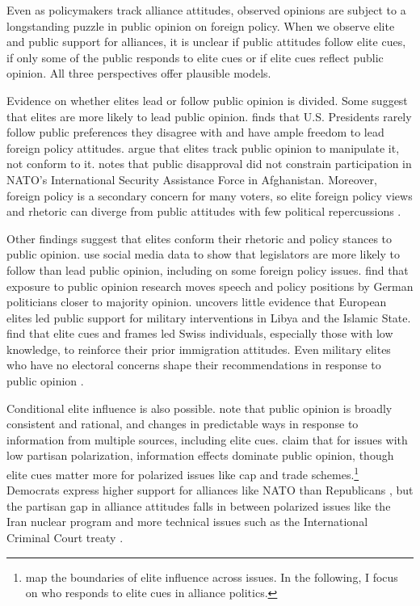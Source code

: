 \documentclass[12pt]{article}
\begin{document}
Even as policymakers track alliance attitudes, observed opinions are subject to a longstanding puzzle in public opinion on foreign policy.
When we observe elite and public support for alliances, it is unclear if public attitudes follow elite cues, if only some of the public responds to elite cues or if elite cues reflect public opinion. 
All three perspectives offer plausible models. 


Evidence on whether elites lead or follow public opinion is divided.
Some suggest that elites are more likely to lead public opinion. 
\citet{Canes-Wrone2006} finds that U.S. Presidents rarely follow public preferences they disagree with and have ample freedom to lead foreign policy attitudes. 
\citet{JacobsShapiro2000} argue that elites track public opinion to manipulate it, not conform to it. 
\citet{Kreps2010} notes that public disapproval did not constrain participation in NATO's International Security Assistance Force in Afghanistan. 
Moreover, foreign policy is a secondary concern for many voters, so elite foreign policy views and rhetoric can diverge from public attitudes with few political repercussions \citep{BusbyMonten2012}. 


Other findings suggest that elites conform their rhetoric and policy stances to public opinion. 
\citet{Barberaetal2019} use social media data to show that legislators are more likely to follow than lead public opinion, including on some foreign policy issues. 
\citet{HagerHilbig2020} find that exposure to public opinion research moves speech and policy positions by German politicians closer to majority opinion. 
\citet{Haesebrouck2019} uncovers little evidence that European elites led public support for military interventions in Libya and the Islamic State. 
\citet{Bechteletal2015} find that elite cues and frames led Swiss individuals, especially those with low knowledge, to reinforce their prior immigration attitudes. 
Even military elites who have no electoral concerns shape their recommendations in response to public opinion \citep{LinGreenberg2021}. 


Conditional elite influence is also possible. 
\citet{PageShapiro1992} note that public opinion is broadly consistent and rational, and changes in predictable ways in response to information from multiple sources, including elite cues. 
\citet{GuisingerSaunders2017} claim that for issues with low partisan polarization, information effects dominate public opinion, though elite cues matter more for polarized issues like cap and trade schemes.\footnote{\citet{GuisingerSaunders2017} map the boundaries of elite influence across issues. In the following, I focus on who responds to elite cues in alliance politics.}
Democrats express higher support for alliances like NATO than Republicans \citep{PewNATO2020}, but the partisan gap in alliance attitudes falls in between polarized issues like the Iran nuclear program and more technical issues such as the International Criminal Court treaty \citet{GuisingerSaunders2017}. 
\end{document}
